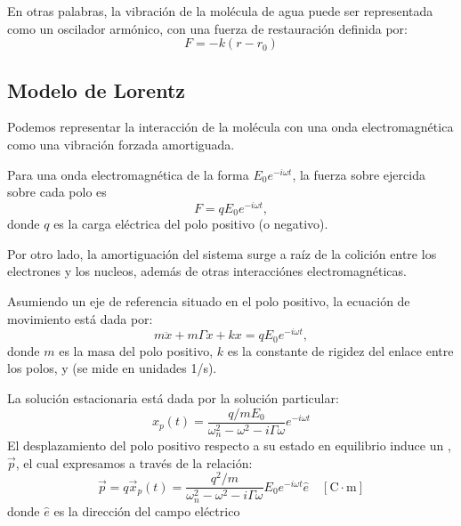\documentclass[letterpaper,10pt,english]{jupyterBook}
\let\sphinxpxdimen\pdfpxdimen\else\newdimen\sphinxpxdimen
\begin{document}
\sphinxAtStartPar
En otras palabras, la vibración de la molécula de agua puede ser representada como un oscilador armónico, con una fuerza de restauración definida por:
\begin{equation*}
F = -k(r - r_0)
\end{equation*}

\subsection{Modelo de Lorentz}
\label{\detokenize{3_Interacci_xf3n_materia-luz/3_Interacci_xf3n_materia-luz:modelo-de-lorentz}}
\sphinxAtStartPar
Podemos representar la interacción de la molécula con una onda electromagnética como una vibración forzada amortiguada.

\noindent{\hspace*{\fill}\sphinxincludegraphics[width=200\sphinxpxdimen]{{molecule_spring_mass}.png}\hspace*{\fill}}

\sphinxAtStartPar
Para una onda electromagnética de la forma \(E_0e^{-i\omega t}\), la fuerza sobre ejercida sobre cada polo es
\begin{equation*}
F = qE_0e^{-i\omega t},
\end{equation*}
\sphinxAtStartPar
donde \(q\) es la carga eléctrica del polo positivo (o negativo).

\sphinxAtStartPar
Por otro lado, la amortiguación del sistema surge a raíz de la colición entre los electrones y los nucleos, además de otras interacciónes electromagnéticas.

\sphinxAtStartPar
Asumiendo un eje de referencia situado en el polo positivo, la ecuación de movimiento está dada por:
\begin{equation*}
m\ddot{x} + m\Gamma \dot{x} +  k x = qE_0 e^{-i\omega t},
\end{equation*}
\sphinxAtStartPar
donde \(m\) es la masa del polo positivo, \(k\) es la constante de rigidez del enlace entre los polos, y  (se mide en unidades 1/s).

\sphinxAtStartPar
La solución estacionaria está dada por la solución particular:
\begin{equation*}
x_p(t) = \frac{q/mE_0}{\omega_n^2 - \omega^2 - i\Gamma \omega}e^{-i\omega t}
\end{equation*}
\sphinxAtStartPar
El desplazamiento del polo positivo respecto a su estado en equilibrio induce un , \(\vec{p}\), el cual expresamos a través de la relación:
\begin{equation*}
\vec{p} = q\vec{x}_p(t) =  \frac{q^2/m}{\omega_n^2 - \omega^2 - i\Gamma \omega}E_0e^{-i\omega t}\hat{e}\quad\mathrm{[C\cdot m]}
\end{equation*}
\sphinxAtStartPar
donde \(\hat{e}\) es la dirección del campo eléctrico
\end{document}
